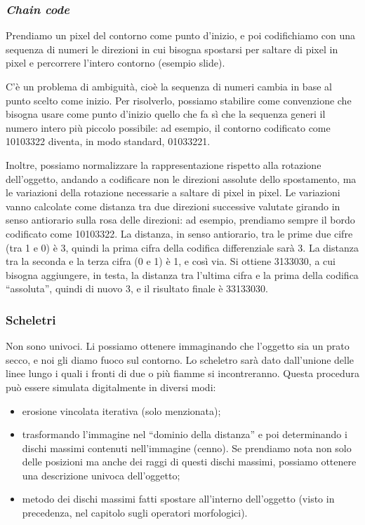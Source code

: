 \documentclass[a4paper,11pt]{article}
\begin{document}
\subsubsection{\textit{Chain code}}
Prendiamo un pixel del contorno come punto d'inizio, e poi codifichiamo con una sequenza di numeri le direzioni in cui bisogna spostarsi per saltare
di pixel in pixel e percorrere l'intero contorno (esempio slide).
\par
C'è un problema di ambiguità, cioè la sequenza di numeri cambia in base al punto scelto come inizio. Per risolverlo, possiamo stabilire come convenzione
che bisogna usare come punto d'inizio quello che fa sì che la sequenza generi il numero intero più piccolo possibile: ad esempio, il contorno codificato come
10103322 diventa, in modo standard, 01033221.
\par
Inoltre, possiamo normalizzare la rappresentazione rispetto alla rotazione dell'oggetto, andando a codificare non le direzioni assolute
dello spostamento, ma le variazioni della rotazione necessarie a saltare di pixel in pixel. Le variazioni vanno calcolate come distanza tra due direzioni successive
valutate girando in senso antiorario sulla rosa delle direzioni: ad esempio, prendiamo sempre il bordo codificato come 10103322. La distanza, in senso antiorario, tra le prime
due cifre (tra 1 e 0) è 3, quindi la prima cifra della codifica differenziale sarà 3. La distanza tra la seconda e la terza cifra (0 e 1) è 1, e così via. Si ottiene 3133030, a cui
bisogna aggiungere, in testa, la distanza tra l'ultima cifra e la prima della codifica ``assoluta'', quindi di nuovo 3, e il risultato finale è 33133030.

\subsubsection{Scheletri}
Non sono univoci. Li possiamo ottenere immaginando che l'oggetto sia un prato secco, e noi gli diamo fuoco sul contorno. Lo scheletro sarà dato dall'unione
delle linee lungo i quali i fronti di due o più fiamme si incontreranno. Questa procedura può essere simulata digitalmente in diversi modi:
\begin{itemize}
    \item erosione vincolata iterativa (solo menzionata);
    \item trasformando l'immagine nel ``dominio della distanza'' e poi determinando i dischi massimi contenuti nell'immagine (cenno). Se prendiamo nota non solo delle posizioni ma anche
    dei raggi di questi dischi massimi, possiamo ottenere una descrizione univoca dell'oggetto;
    \item metodo dei dischi massimi fatti spostare all'interno dell'oggetto (visto in precedenza, nel capitolo sugli operatori morfologici).
\end{itemize}
\end{document}
